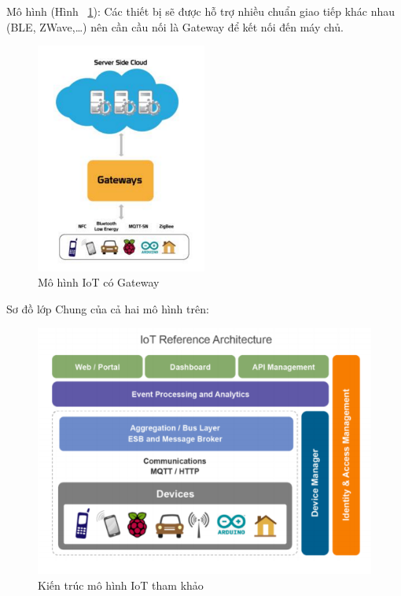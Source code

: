 Mô hình (Hình ~\ref{fig:pic6}): Các thiết bị sẽ được hỗ trợ nhiều chuẩn giao tiếp khác nhau (BLE, ZWave,…) nên cần cầu nối là Gateway để kết nối đến máy chủ. 
	
	

\begin{figure}[htbp!] 
\centering    
\includegraphics[width=0.5\textwidth]{pic6}
\caption[Mô hình IoT có Gateway]{Mô hình IoT có Gateway}
\label{fig:pic6}
\end{figure}


Sơ đồ lớp Chung của cả hai mô hình trên:


\begin{figure}[htbp!] 
\centering    
\includegraphics[width=1\textwidth]{pic7}
\caption[Kiến trúc mô hình IoT tham khảo]{Kiến trúc mô hình IoT tham khảo}
\label{fig:pic7}
\end{figure}



